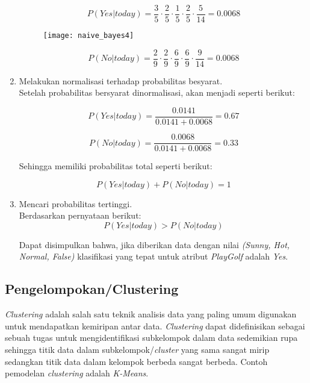 \begin{enumerate}
\begin{equation}
P(Yes|today) = \frac{3}{5} \cdot \frac{2}{5} \cdot \frac{1}{5} \cdot \frac{2}{5} \cdot \frac{5}{14} = 0.0068
\end{equation}

\begin{figure}[H]
	\centering
	\texttt{[image: naive\_bayes4]}
	\label{fig:naive_bayes4}
\end{figure}

\begin{equation}
P(No|today) = \frac{2}{9} \cdot \frac{2}{9} \cdot \frac{6}{9} \cdot \frac{6}{9} \cdot \frac{9}{14} = 0.0068
\end{equation}

\item Melakukan normalisasi terhadap probabilitas besyarat.\\

Setelah probabilitas bersyarat dinormalisasi, akan menjadi seperti berikut:

\begin{equation}
P(Yes|today) = \frac{0.0141}{0.0141 + 0.0068} = 0.67
\end{equation}

\begin{equation}
P(No|today) = \frac{0.0068}{0.0141 + 0.0068} = 0.33
\end{equation}

Sehingga memiliki probabilitas total seperti berikut:

\begin{equation}
P(Yes|today) + P(No|today) = 1
\end{equation}

\item Mencari probabilitas tertinggi.\\

Berdasarkan pernyataan berikut:
\begin{equation}
P(Yes|today) > P(No|today)
\end{equation}

\noindent Dapat disimpulkan bahwa, jika diberikan data dengan nilai \textit{(Sunny, Hot, Normal, False)} klasifikasi yang tepat untuk atribut \textit{PlayGolf} adalah \textit{Yes}.

\end{enumerate}

\subsection{Pengelompokan/Clustering} 
\textit{Clustering} adalah salah satu teknik analisis data yang paling umum digunakan untuk mendapatkan kemiripan antar data. \textit{Clustering} dapat didefinisikan sebagai sebuah tugas untuk mengidentifikasi subkelompok dalam data sedemikian rupa sehingga titik data dalam subkelompok/\textit{cluster} yang sama sangat mirip sedangkan titik data dalam kelompok berbeda sangat berbeda. Contoh pemodelan \textit{clustering} adalah \textit{K-Means}.

